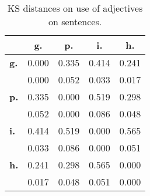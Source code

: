 \begin{table}[h!]
\begin{center}
\begin{tabular}{| l || c | c | c | c |}\hline
 & {\bf g.} & {\bf p.} & {\bf i.} & {\bf h.} \\\hline\hline
{\bf g.} & 0.000 & 0.335 & 0.414 & 0.241 \\
{\bf } & 0.000 & 0.052 & 0.033 & 0.017 \\\hline
{\bf p.} & 0.335 & 0.000 & 0.519 & 0.298 \\
{\bf } & 0.052 & 0.000 & 0.086 & 0.048 \\\hline
{\bf i.} & 0.414 & 0.519 & 0.000 & 0.565 \\
{\bf } & 0.033 & 0.086 & 0.000 & 0.051 \\\hline
{\bf h.} & 0.241 & 0.298 & 0.565 & 0.000 \\
{\bf } & 0.017 & 0.048 & 0.051 & 0.000 \\\hline
\end{tabular}
\caption{KS distances on use of adjectives on sentences.}
\end{center}
\end{table}